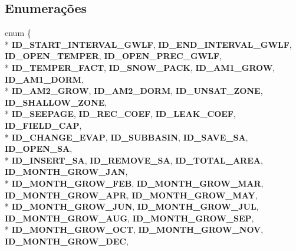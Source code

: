 \subsection*{Enumerações}
\begin{DoxyCompactItemize}
\item 
enum \{ \\*
{\bf I\+D\+\_\+\+S\+T\+A\+R\+T\+\_\+\+I\+N\+T\+E\+R\+V\+A\+L\+\_\+\+G\+W\+LF}, 
{\bf I\+D\+\_\+\+E\+N\+D\+\_\+\+I\+N\+T\+E\+R\+V\+A\+L\+\_\+\+G\+W\+LF}, 
{\bf I\+D\+\_\+\+O\+P\+E\+N\+\_\+\+T\+E\+M\+P\+ER}, 
{\bf I\+D\+\_\+\+O\+P\+E\+N\+\_\+\+P\+R\+E\+C\+\_\+\+G\+W\+LF}, 
\\*
{\bf I\+D\+\_\+\+T\+E\+M\+P\+E\+R\+\_\+\+F\+A\+CT}, 
{\bf I\+D\+\_\+\+S\+N\+O\+W\+\_\+\+P\+A\+CK}, 
{\bf I\+D\+\_\+\+A\+M1\+\_\+\+G\+R\+OW}, 
{\bf I\+D\+\_\+\+A\+M1\+\_\+\+D\+O\+RM}, 
\\*
{\bf I\+D\+\_\+\+A\+M2\+\_\+\+G\+R\+OW}, 
{\bf I\+D\+\_\+\+A\+M2\+\_\+\+D\+O\+RM}, 
{\bf I\+D\+\_\+\+U\+N\+S\+A\+T\+\_\+\+Z\+O\+NE}, 
{\bf I\+D\+\_\+\+S\+H\+A\+L\+L\+O\+W\+\_\+\+Z\+O\+NE}, 
\\*
{\bf I\+D\+\_\+\+S\+E\+E\+P\+A\+GE}, 
{\bf I\+D\+\_\+\+R\+E\+C\+\_\+\+C\+O\+EF}, 
{\bf I\+D\+\_\+\+L\+E\+A\+K\+\_\+\+C\+O\+EF}, 
{\bf I\+D\+\_\+\+F\+I\+E\+L\+D\+\_\+\+C\+AP}, 
\\*
{\bf I\+D\+\_\+\+C\+H\+A\+N\+G\+E\+\_\+\+E\+V\+AP}, 
{\bf I\+D\+\_\+\+S\+U\+B\+B\+A\+S\+IN}, 
{\bf I\+D\+\_\+\+S\+A\+V\+E\+\_\+\+SA}, 
{\bf I\+D\+\_\+\+O\+P\+E\+N\+\_\+\+SA}, 
\\*
{\bf I\+D\+\_\+\+I\+N\+S\+E\+R\+T\+\_\+\+SA}, 
{\bf I\+D\+\_\+\+R\+E\+M\+O\+V\+E\+\_\+\+SA}, 
{\bf I\+D\+\_\+\+T\+O\+T\+A\+L\+\_\+\+A\+R\+EA}, 
{\bf I\+D\+\_\+\+M\+O\+N\+T\+H\+\_\+\+G\+R\+O\+W\+\_\+\+J\+AN}, 
\\*
{\bf I\+D\+\_\+\+M\+O\+N\+T\+H\+\_\+\+G\+R\+O\+W\+\_\+\+F\+EB}, 
{\bf I\+D\+\_\+\+M\+O\+N\+T\+H\+\_\+\+G\+R\+O\+W\+\_\+\+M\+AR}, 
{\bf I\+D\+\_\+\+M\+O\+N\+T\+H\+\_\+\+G\+R\+O\+W\+\_\+\+A\+PR}, 
{\bf I\+D\+\_\+\+M\+O\+N\+T\+H\+\_\+\+G\+R\+O\+W\+\_\+\+M\+AY}, 
\\*
{\bf I\+D\+\_\+\+M\+O\+N\+T\+H\+\_\+\+G\+R\+O\+W\+\_\+\+J\+UN}, 
{\bf I\+D\+\_\+\+M\+O\+N\+T\+H\+\_\+\+G\+R\+O\+W\+\_\+\+J\+UL}, 
{\bf I\+D\+\_\+\+M\+O\+N\+T\+H\+\_\+\+G\+R\+O\+W\+\_\+\+A\+UG}, 
{\bf I\+D\+\_\+\+M\+O\+N\+T\+H\+\_\+\+G\+R\+O\+W\+\_\+\+S\+EP}, 
\\*
{\bf I\+D\+\_\+\+M\+O\+N\+T\+H\+\_\+\+G\+R\+O\+W\+\_\+\+O\+CT}, 
{\bf I\+D\+\_\+\+M\+O\+N\+T\+H\+\_\+\+G\+R\+O\+W\+\_\+\+N\+OV}, 
{\bf I\+D\+\_\+\+M\+O\+N\+T\+H\+\_\+\+G\+R\+O\+W\+\_\+\+D\+EC}, 

\end{DoxyCompactItemize}
